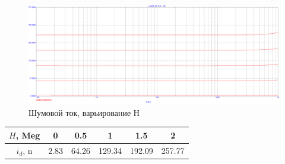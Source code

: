 \documentclass[a4paper, 12pt]{article}%
\begin{document}
\begin{enumerate}
\begin{figure}[h!]
    \centering
    \includegraphics[scale=0.3]{images/mod6_1_3.png}
    \caption{Шумовой ток, варьирование Н}
    \label{fig:m613}
\end{figure}

\begin{center}
\begin{table}[h!]
    \centering
    \begin{tabular}{|c|c|c|c|c|c|}
    \hline
        $H$, Meg & 0 & 0.5 & 1 & 1.5 & 2\\ \hline
        $i_d$, n & 2.83 & 64.26 & 129.34 & 192.09 & 257.77 \\ \hline
    \end{tabular}
    \label{tab:mt613}
\end{table}
\end{center}

\FloatBarrier

\end{enumerate}
\end{document}
